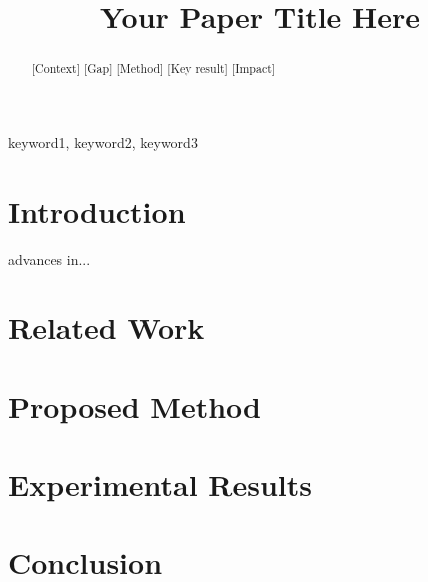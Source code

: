 \documentclass[journal]{IEEEtran}
\begin{document}
\title{Your Paper Title Here}
\author{
\and
{}
}

\maketitle

\begin{abstract}
  [Context] [Gap] [Method] [Key result] [Impact]
\end{abstract}

\begin{IEEEkeywords}
keyword1, keyword2, keyword3
\end{IEEEkeywords}

\section{Introduction}
 advances in...
\section{Related Work}
\section{Proposed Method}
\section{Experimental Results}
\section{Conclusion}



\end{document}
